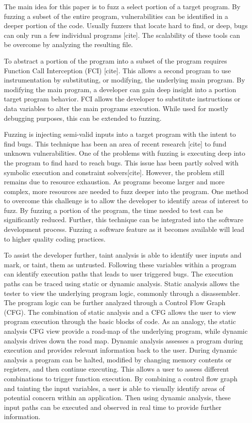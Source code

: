\documentclass[conference]{IEEEtran}
\begin{document}
The main idea for this paper is to fuzz a select portion of a target program. By fuzzing a subset of the entire program, vulnerabilities can be identified in a deeper portion of the code. Usually fuzzers that locate hard to find, or deep, bugs can only run a few individual programs [cite]. The scalability of these tools can be overcome by analyzing the resulting file. 

To abstract a portion of the program into a subset of the program requires Function Call Interception (FCI) [cite]. This allows a second program to use instrumentation by substituting, or modifying, the underlying main program. By modifying the main program, a developer can gain deep insight into a portion target program behavior. FCI allows the developer to substitute instructions or data variables to alter the main programs execution. While used for mostly debugging purposes, this can be extended to fuzzing.

Fuzzing is injecting semi-valid inputs into a target program with the intent to find bugs. This technique has been an area of recent research [cite] to fund unknown vulnerabilities. One of the problems with fuzzing is executing deep into the program to find hard to reach bugs. This issue has been partly solved with symbolic execution and constraint solvers[cite]. However, the problem still remains due to resource exhaustion. As programs become larger and more complex, more resources are needed to fuzz deeper into the program. One method to overcome this challenge is to allow the developer to identify areas of interest to fuzz. By fuzzing a portion of the program, the time needed to test can be significantly reduced. Further, this technique can be integrated into the software development process. Fuzzing a software feature as it becomes available will lead to higher quality coding practices. 

To assist the developer further, taint analysis is able to identify user inputs and mark, or taint, them as untrusted. Following these variables within a program can identify execution paths that leads to user triggered bugs. The execution paths can be traced using static or dynamic analysis. Static analysis allows the tester to view the underlying program logic, commonly through a disassembler. The program logic can be further analyzed through a Control Flow Graph (CFG). The combination of static analysis and a CFG allows the user to view program execution through the basic blocks of code. As an analogy, the static analysis CFG view provide a road-map of the underlying program, while dynamic analysis drives down the road map. Dynamic analysis assesses a program during execution and provides relevant information back to the user. During dynamic analysis a program can be halted, modified by changing memory contents or registers, and then continue executing. This allows a user to assess different combinations to trigger function execution. By combining a control flow graph and tainting the input variables, a user is able to visually identify areas of potential concern within an application. Then using dynamic analysis, these input paths can be executed and observed in real time to provide further information. 
\end{document}
